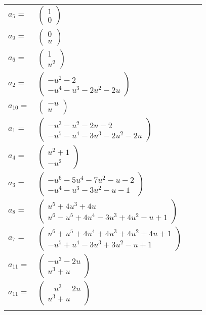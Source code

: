 \documentclass[1p]{elsarticle_modified}
\theoremstyle{definition}
\begin{document}
\begin{tabular}{m{7pt} m{180pt} m{7pt} m{180pt} }
\flushright $a_{5}=$&$\begin{pmatrix}1\\0\end{pmatrix}$ \\
\flushright $a_{9}=$&$\begin{pmatrix}0\\u\end{pmatrix}$ \\
\flushright $a_{6}=$&$\begin{pmatrix}1\\u^2\end{pmatrix}$ \\
\flushright $a_{2}=$&$\begin{pmatrix}- u^2-2\\- u^4- u^3-2 u^2-2 u\end{pmatrix}$ \\
\flushright $a_{10}=$&$\begin{pmatrix}- u\\u\end{pmatrix}$ \\
\flushright $a_{1}=$&$\begin{pmatrix}- u^3- u^2-2 u-2\\- u^5- u^4-3 u^3-2 u^2-2 u\end{pmatrix}$ \\
\flushright $a_{4}=$&$\begin{pmatrix}u^2+1\\- u^2\end{pmatrix}$ \\
\flushright $a_{3}=$&$\begin{pmatrix}- u^6-5 u^4-7 u^2- u-2\\- u^4- u^3-3 u^2- u-1\end{pmatrix}$ \\
\flushright $a_{8}=$&$\begin{pmatrix}u^5+4 u^3+4 u\\u^6- u^5+4 u^4-3 u^3+4 u^2- u+1\end{pmatrix}$ \\
\flushright $a_{7}=$&$\begin{pmatrix}u^6+u^5+4 u^4+4 u^3+4 u^2+4 u+1\\- u^5+u^4-3 u^3+3 u^2- u+1\end{pmatrix}$ \\
\flushright $a_{11}=$&$\begin{pmatrix}- u^3-2 u\\u^3+u\end{pmatrix}$\\ \flushright $a_{11}=$&$\begin{pmatrix}- u^3-2 u\\u^3+u\end{pmatrix}$\\&\end{tabular}
\end{document}
